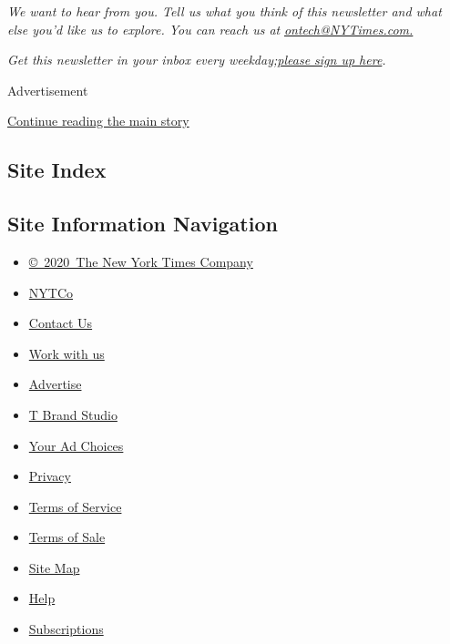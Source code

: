 \emph{We want to hear from you. Tell us what you think of this
newsletter and what else you'd like us to explore. You can reach us at}
\href{mailto:ontech@NYTimes.com?subject=On\%20Tech\%20Feedback}{\emph{ontech@NYTimes.com.}}

\emph{Get this newsletter in your inbox every
weekday;}\href{https://www.nytimes3xbfgragh.onion/newsletters/signup/OT}{\emph{please
sign up here}}\emph{.}

Advertisement

\protect\hyperlink{after-bottom}{Continue reading the main story}

\hypertarget{site-index}{%
\subsection{Site Index}\label{site-index}}

\hypertarget{site-information-navigation}{%
\subsection{Site Information
Navigation}\label{site-information-navigation}}

\begin{itemize}
\tightlist
\item
  \href{https://help.nytimes3xbfgragh.onion/hc/en-us/articles/115014792127-Copyright-notice}{©~2020~The
  New York Times Company}
\end{itemize}

\begin{itemize}
\tightlist
\item
  \href{https://www.nytco.com/}{NYTCo}
\item
  \href{https://help.nytimes3xbfgragh.onion/hc/en-us/articles/115015385887-Contact-Us}{Contact
  Us}
\item
  \href{https://www.nytco.com/careers/}{Work with us}
\item
  \href{https://nytmediakit.com/}{Advertise}
\item
  \href{http://www.tbrandstudio.com/}{T Brand Studio}
\item
  \href{https://www.nytimes3xbfgragh.onion/privacy/cookie-policy\#how-do-i-manage-trackers}{Your
  Ad Choices}
\item
  \href{https://www.nytimes3xbfgragh.onion/privacy}{Privacy}
\item
  \href{https://help.nytimes3xbfgragh.onion/hc/en-us/articles/115014893428-Terms-of-service}{Terms
  of Service}
\item
  \href{https://help.nytimes3xbfgragh.onion/hc/en-us/articles/115014893968-Terms-of-sale}{Terms
  of Sale}
\item
  \href{https://spiderbites.nytimes3xbfgragh.onion}{Site Map}
\item
  \href{https://help.nytimes3xbfgragh.onion/hc/en-us}{Help}
\item
  \href{https://www.nytimes3xbfgragh.onion/subscription?campaignId=37WXW}{Subscriptions}
\end{itemize}
